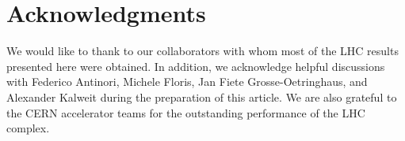 \section*{Acknowledgments}

We would like to thank to our collaborators with whom most of the LHC results presented here were obtained. In addition, we acknowledge helpful discussions with Federico Antinori, Michele Floris, Jan Fiete Grosse-Oetringhaus, and Alexander Kalweit during the preparation of this article. We are also grateful to the CERN accelerator teams for the outstanding performance of the LHC complex. 
